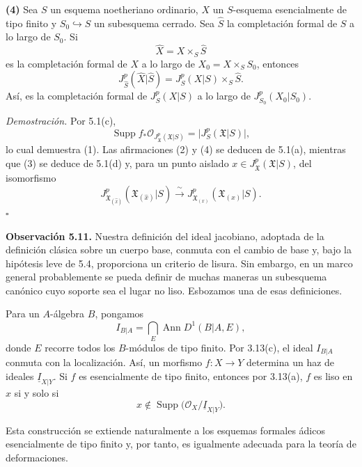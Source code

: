 \smallskip
\noindent\textbf{(4)} Sea $S$ un esquema noetheriano ordinario,
$X$ un $S$-esquema esencialmente de tipo finito y
$S_0\hookrightarrow S$ un subesquema cerrado. Sea $\widehat S$ la
completación formal de $S$ a lo largo de $S_0$. Si
\[
\widehat X=X\times_S\widehat S
\]
es la completación formal de $X$ a lo largo de
$X_0=X\times_SS_0$, entonces
\[
J_{\widehat S}^p(\widehat X|\widehat S)
=J_S^p(X|S)\times_S\widehat S.
\]
Así, es la completación formal de $J_S^p(X|S)$ a lo largo de
$J_{S_0}^p(X_0|S_0)$.

\smallskip
\noindent\textit{Demostración.}
Por 5.1(c),
\[
\operatorname{Supp}
 f_*\mathcal O_{J_{\mathfrak X}^p(\mathfrak X|S)}
=\bigl|J_S^p(\mathfrak X|S)\bigr|,
\]
lo cual demuestra (1). Las afirmaciones (2) y (4) se deducen de
5.1(a), mientras que (3) se deduce de 5.1(d) y, para un punto aislado
$x\in J_{\mathfrak X}^p(\mathfrak X|S)$, del isomorfismo
\[
J_{\mathfrak X_{(\widehat{x})}}^p
 (\mathfrak X_{(\widehat{x})}|S)
\xrightarrow{\ \sim\ }
J_{\mathfrak X_{(x)}}^p(\mathfrak X_{(x)}|S).
\]
\hfill$\square$

\medskip
\noindent\textbf{Observación 5.11.}
Nuestra definición del ideal jacobiano, adoptada de la definición
clásica sobre un cuerpo base, conmuta con el cambio de base y, bajo la
hipótesis leve de 5.4, proporciona un criterio de lisura. Sin embargo,
en un marco general probablemente se pueda definir de muchas maneras
un subesquema canónico cuyo soporte sea el lugar no liso. Esbozamos una
de esas definiciones.

Para un $A$-álgebra $B$, pongamos
\[
I_{B|A}=\bigcap_E\operatorname{Ann}D^1(B|A,E),
\]
donde $E$ recorre todos los $B$-módulos de tipo finito. Por 3.13(c),
el ideal $I_{B|A}$ conmuta con la localización. Así, un morfismo
$f:X\longrightarrow Y$ determina un haz de ideales
$\underline I_{X|Y}$. Si $f$ es esencialmente de tipo finito, entonces
por 3.13(a), $f$ es liso en $x$ si y solo si
\[
x\notin\operatorname{Supp}
 \bigl(\mathcal O_X/\underline I_{X|Y}\bigr).
\]


Esta construcción se extiende naturalmente a los esquemas formales
ádicos esencialmente de tipo finito y, por tanto, es igualmente
adecuada para la teoría de deformaciones.
